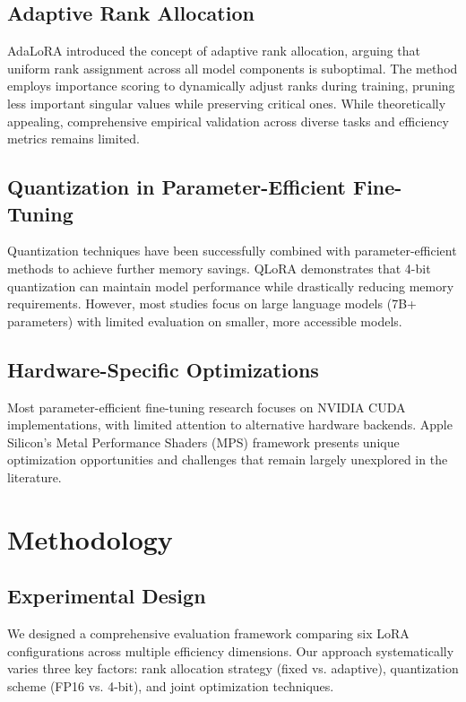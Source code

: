 \documentclass[11pt,a4paper]{article}
\begin{document}
\subsection{Adaptive Rank Allocation}

AdaLoRA \cite{zhang2023adaptive} introduced the concept of adaptive rank allocation, arguing that uniform rank assignment across all model components is suboptimal. The method employs importance scoring to dynamically adjust ranks during training, pruning less important singular values while preserving critical ones. While theoretically appealing, comprehensive empirical validation across diverse tasks and efficiency metrics remains limited.

\subsection{Quantization in Parameter-Efficient Fine-Tuning}

Quantization techniques have been successfully combined with parameter-efficient methods to achieve further memory savings. QLoRA \cite{dettmers2023qlora} demonstrates that 4-bit quantization can maintain model performance while drastically reducing memory requirements. However, most studies focus on large language models (7B+ parameters) with limited evaluation on smaller, more accessible models.

\subsection{Hardware-Specific Optimizations}

Most parameter-efficient fine-tuning research focuses on NVIDIA CUDA implementations, with limited attention to alternative hardware backends. Apple Silicon's Metal Performance Shaders (MPS) framework presents unique optimization opportunities and challenges that remain largely unexplored in the literature.

\section{Methodology}

\subsection{Experimental Design}

We designed a comprehensive evaluation framework comparing six LoRA configurations across multiple efficiency dimensions. Our approach systematically varies three key factors: rank allocation strategy (fixed vs. adaptive), quantization scheme (FP16 vs. 4-bit), and joint optimization techniques.
\end{document}
